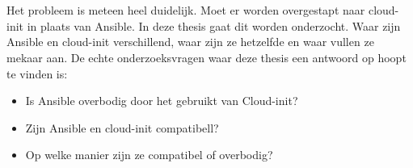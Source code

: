 
\section{}
\label{sec:probleemstellingonderzoeksvraag}

Het probleem is meteen heel duidelijk. Moet er worden overgestapt naar cloud-init in plaats van Ansible. In deze thesis gaat dit worden onderzocht. Waar zijn Ansible en cloud-init verschillend, waar zijn ze hetzelfde en waar vullen ze mekaar aan. De echte onderzoeksvragen waar deze thesis een antwoord op hoopt te vinden is:

\begin{itemize}
    \item Is Ansible overbodig door het gebruikt van Cloud-init?
    \item Zijn Ansible en cloud-init compatibell?
    \item Op welke manier zijn ze compatibel of overbodig?
\end{itemize}






